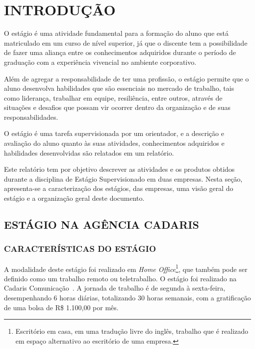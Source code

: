 \documentclass[
  12pt,            %
  openany,
  oneside,
  a4paper,         %
  english,      %
  brazil
]{article}
\numberwithin{figure}{section}
\numberwithin{table}{section}
\begin{document}

\begin{titlepage}

\begin{singlespace}
{\small
  \tableofcontents
}
\end{singlespace}

\end{titlepage}



\section{INTRODUÇÃO}

O estágio é uma atividade fundamental para a formação do aluno que está matriculado em um curso de nível superior, já que o discente tem a possibilidade de fazer uma aliança entre os conhecimentos adquiridos durante o período de graduação com a experiência vivencial no ambiente corporativo.

Além de agregar a responsabilidade de ter uma profissão, o estágio permite que o aluno desenvolva habilidades que são essenciais no mercado de trabalho, tais como liderança, trabalhar em equipe, resiliência, entre outros, através de situações e desafios que possam vir ocorrer dentro da organização e de suas responsabilidades.

O estágio é uma tarefa supervisionada por um orientador, e a descrição e avaliação do aluno quanto às suas atividades, conhecimentos adquiridos e habilidades desenvolvidas são relatados em um relatório.

Este relatório tem por objetivo descrever as atividades e os produtos obtidos durante a disciplina de Estágio Supervisionado em duas empresas. Nesta seção, apresenta-se a caracterização dos estágios, das empresas, uma visão geral do estágio e a organização geral deste documento.


\subsection{ESTÁGIO NA AGÊNCIA CADARIS}

\subsubsection{CARACTERÍSTICAS DO ESTÁGIO}

A modalidade deste estágio foi realizado em \textit{Home Office}\footnote{Escritório em casa, em uma tradução livre do inglês, trabalho que é realizado em espaço alternativo ao escritório de uma empresa.}, que também pode ser definido como um trabalho remoto ou teletrabalho. O estágio foi realizado na Cadaris Comunicação~\cite{cadaris}. A jornada de trabalho é de segunda à sexta-feira, desempenhando 6 horas diárias, totalizando 30 horas semanais, com a gratificação de uma bolsa de R\$ 1.100,00 por mês.
\end{document}
